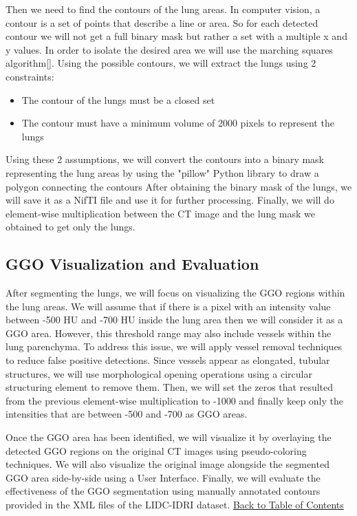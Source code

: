 Then we need to find the contours of the lung areas. In computer vision, a contour is a set of points that describe a line or area.
So for each detected contour we will not get a full binary mask but rather a set with a multiple x and y values.
In order to isolate the desired area we will use the marching squares algorithm[]. Using the possible contours, we will extract the
lungs using 2 constraints:
\begin{itemize}
    \item The contour of the lungs must be a closed set
    \item The contour must have a minimum volume of 2000 pixels to represent the lungs
\end{itemize}

Using these 2 assumptions, we will convert the contours into a binary mask representing the lung areas by using the "pillow"
Python library to draw a polygon connecting the contours
After obtaining the binary mask of the lungs, we will save it as a NifTI file and use it for further processing.
Finally, we will do element-wise multiplication between the CT image and the lung mask we obtained to get only the lungs.

\subsection{GGO Visualization and Evaluation}
After segmenting the lungs, we will focus on visualizing the GGO regions within the lung areas. We will assume that if there is a
pixel with an intensity value between -500 HU and -700 HU inside the lung area then we will consider it as a GGO area.
However, this threshold range may also include vessels within the lung parenchyma.
To address this issue, we will apply vessel removal techniques to reduce false positive detections. Since vessels appear
as elongated, tubular structures, we will use morphological opening operations using a circular structuring element to remove them.
Then, we will set the zeros that resulted from the previous element-wise multiplication to -1000 and finally keep only the
intensities that are between -500 and -700 as GGO areas.

Once the GGO area has been identified, we will visualize it by overlaying the detected GGO regions on the original CT images using
pseudo-coloring techniques. We will also visualize the original image alongside the segmented GGO area side-by-side using a User Interface.
Finally, we will evaluate the effectiveness of the GGO segmentation using manually annotated contours provided in the XML files of the LIDC-IDRI dataset.
\hyperref[contents]{\small Back to Table of Contents}